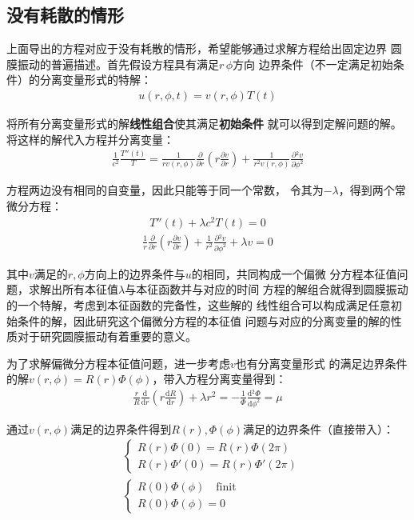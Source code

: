 \documentclass[a4paper]{ctexart}
\def\d{\mathrm{d}}
\newcommand{\mr}[1]{\mathrm{#1}}
\newcommand{\dv}[2]{\frac{\d{#1}}{\d{#2}}}
\newcommand{\pdv}[2]{\frac{\partial{#1}}{\partial{#2}}}
\begin{document}
	\subsection{没有耗散的情形}
	上面导出的方程对应于没有耗散的情形，希望能够通过求解方程给出固定边界
	圆膜振动的普遍描述。首先假设方程具有满足$r\, \phi$方向
	边界条件（不一定满足初始条件）的分离变量形式的特解：
	\begin{align}
		u(r, \phi, t) = v(r, \phi)T(t)
	\end{align}
	\par 将所有分离变量形式的解\textbf{线性组合}使其满足\textbf{初始条件}
	就可以得到定解问题的解。将这样的解代入方程并分离变量：
	\begin{align}
		\frac{1}{c^2}\frac{T''(t)}{T} = \frac{1}{rv(r,\phi)}\pdv{}{r}\left(r\pdv{v}{r}\right)
		 + \frac{1}{r^2 v(r,\phi)}\pdv{^2 v}{\phi^2}
	\end{align}
	\par 方程两边没有相同的自变量，因此只能等于同一个常数，
	令其为$-\lambda$，得到两个常微分方程：
	\begin{align}
		T{''}(t) + \lambda c^2T(t) = 0
		\label{time eq}
	\end{align}
	\begin{align}
		\frac{1}{r}\pdv{}{r}\left(r\pdv{v}{r}\right) + \frac{1}{r^2}\pdv{^2 v}{\phi^2} + \lambda v = 0
		\label{mode}
	\end{align}
	\par 其中$v$满足的$r, \phi$方向上的边界条件与$u$的相同，共同构成一个偏微
	分方程本征值问题，求解出所有本征值$\lambda$与本征函数并与对应的时间
	方程的解组合就得到圆膜振动的一个特解，考虑到本征函数的完备性，这些解的
	线性组合可以构成满足任意初始条件的解，因此研究这个偏微分方程的本征值
	问题与对应的分离变量的解的性质对于研究圆膜振动有着重要的意义。
	\par 为了求解偏微分方程本征值问题，进一步考虑$v$也有分离变量形式
	的满足边界条件的解$v(r, \phi) = R(r)\Phi(\phi)$，带入方程分离变量得到：
	\begin{align}
		\frac{r}{R}\dv{}{r}\left(r\dv{R}{r}\right) + \lambda r^{2} = -\frac{1}{\Phi}\dv{^2 \Phi}{\phi^2} = \mu
	\end{align}
	\par 通过$v(r, \phi)$满足的边界条件得到$R(r), \Phi(\phi)$满足的边界条件（直接带入）：
	\begin{align}
		&\left\{
			\begin{array}{lr}
				R(r)\Phi(0) = R(r)\Phi(2\pi)\\
				R(r)\Phi'(0) = R(r)\Phi'(2\pi)
			\end{array}
		\right.\\
		&\left\{ 
			\begin{array}{lr}
				R(0)\Phi(\phi)\quad \mr{finit}\\
				R(0)\Phi(\phi) = 0
			\end{array}
		\right.
	\end{align}
\end{document}
